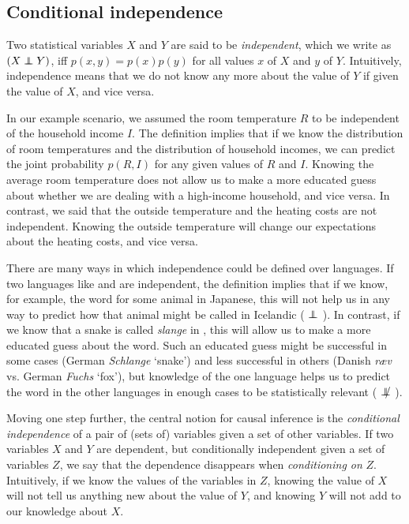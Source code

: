 \subsection{Conditional independence}
Two statistical variables $X$ and $Y$ are said to be \textit{independent}, which we write as $(X \independent Y)$, iff $p(x,y)=p(x)p(y)$ for all values $x$ of $X$ and $y$ of $Y$. Intuitively, independence means that we do not know any more about the value of $Y$ if given the value of $X$, and vice versa.

In our example scenario, we assumed the room temperature $R$ to be independent of the household income $I$. The definition implies that if we know the distribution of room temperatures and the distribution of household incomes, we can predict the joint probability $p(R,I)$ for any given values of $R$ and $I$. Knowing the average room temperature does not allow us to make a more educated guess about whether we are dealing with a high-income household, and vice versa. In contrast, we said that the outside temperature and the heating costs are not independent. Knowing the outside temperature will change our expectations about the heating costs, and vice versa.

There are many ways in which independence could be defined over languages. If two languages like  and  are independent, the definition implies that if we know, for example, the word for some animal in Japanese, this will not help us in any way to predict how that animal might be called in Icelandic ( $\independent$ ). In contrast, if we know that a snake is called \textit{slange} in , this will allow us to make a more educated guess about the  word. Such an educated guess might be successful in some cases (German \textit{Schlange} `snake') and less successful in others (Danish \textit{ræv} vs. German \textit{Fuchs} `fox'), but knowledge of the one language helps us to predict the word in the other languages in enough cases to be statistically relevant ( $\notindep$ ). 

Moving one step further, the central notion for causal inference is the \textit{conditional independence} of a pair of (sets of) variables given a set of other variables. If two variables $X$ and $Y$ are dependent, but conditionally independent given a set of variables $Z$, we say that the dependence disappears when \textit{conditioning on} $Z$. Intuitively, if we know the values of the variables in $Z$, knowing the value of $X$ will not tell us anything new about the value of $Y$, and knowing $Y$ will not add to our knowledge about $X$.

